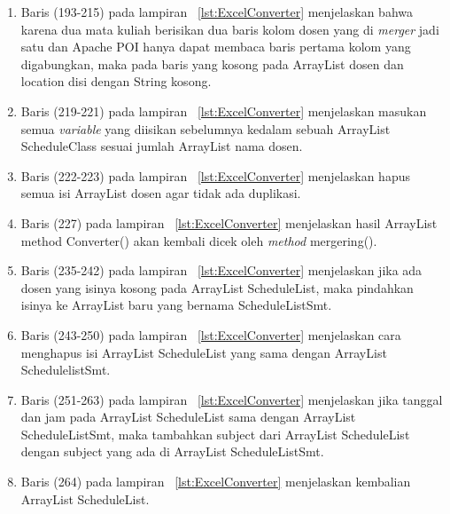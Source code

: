 \begin{enumerate}
\begin{enumerate}
		\item Baris (193-215) pada lampiran ~\ref{lst:ExcelConverter} menjelaskan bahwa karena dua mata kuliah berisikan dua baris kolom dosen yang di \textit{merger} jadi satu dan Apache POI hanya dapat membaca baris pertama kolom yang digabungkan, maka pada baris yang kosong pada ArrayList dosen dan location disi dengan String kosong.
		\item Baris (219-221) pada lampiran ~\ref{lst:ExcelConverter} menjelaskan masukan semua \textit{variable} yang diisikan sebelumnya kedalam sebuah ArrayList ScheduleClass sesuai jumlah ArrayList nama dosen.
		\item Baris (222-223) pada lampiran ~\ref{lst:ExcelConverter} menjelaskan hapus semua isi ArrayList dosen agar tidak ada duplikasi.
		\item Baris (227) pada lampiran ~\ref{lst:ExcelConverter} menjelaskan hasil ArrayList method Converter() akan kembali dicek oleh \textit{method} mergering().
		\item Baris (235-242) pada lampiran ~\ref{lst:ExcelConverter} menjelaskan jika ada dosen yang isinya kosong pada ArrayList ScheduleList, maka pindahkan isinya ke ArrayList baru yang bernama ScheduleListSmt.
		\item Baris (243-250) pada lampiran ~\ref{lst:ExcelConverter} menjelaskan cara menghapus isi ArrayList ScheduleList yang sama dengan ArrayList SchedulelistSmt.
		\item Baris (251-263) pada lampiran ~\ref{lst:ExcelConverter} menjelaskan jika tanggal dan jam pada ArrayList ScheduleList sama dengan ArrayList ScheduleListSmt, maka tambahkan subject dari ArrayList ScheduleList dengan subject yang ada di ArrayList ScheduleListSmt.
		\item Baris (264) pada lampiran ~\ref{lst:ExcelConverter} menjelaskan kembalian ArrayList ScheduleList.				
	\end{enumerate}


\end{enumerate}
